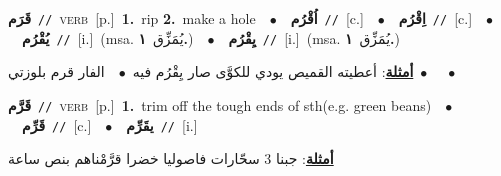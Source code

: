 \documentclass[10pt,a4paper,twoside]{article} %
\begin{document}
\begin{multicols}{2}
{\setlength\topsep{0pt}\textbf{\foreignlanguage{arabic}{قَرَم}}\ {\color{gray}\texttt{//}\color{black}}\ \textsc{verb}\ [p.]\ \textbf{1.}~rip  \textbf{2.}~make a hole\ \ $\bullet$\ \ \setlength\topsep{0pt}\textbf{\foreignlanguage{arabic}{اُقْرُم}}\ {\color{gray}\texttt{//}\color{black}}\ [c.]\ \ $\bullet$\ \ \setlength\topsep{0pt}\textbf{\foreignlanguage{arabic}{اِقْرُم}}\ {\color{gray}\texttt{//}\color{black}}\ [c.]\ \ $\bullet$\ \ \setlength\topsep{0pt}\textbf{\foreignlanguage{arabic}{يُقْرُم}}\ {\color{gray}\texttt{//}\color{black}}\ [i.]\ \color{gray}(msa. \foreignlanguage{arabic}{يُمَزِّق}~\foreignlanguage{arabic}{\textbf{١.}})\color{black}\ \ $\bullet$\ \ \setlength\topsep{0pt}\textbf{\foreignlanguage{arabic}{يِقْرُم}}\ {\color{gray}\texttt{//}\color{black}}\ [i.]\ \color{gray}(msa. \foreignlanguage{arabic}{يُمَزِّق}~\foreignlanguage{arabic}{\textbf{١.}})\color{black}\  \begin{flushright}\color{gray}\foreignlanguage{arabic}{\textbf{\underline{\foreignlanguage{arabic}{أمثلة}}}: أعطيته القميص يودي للكوَّى صار يِقْرُم فيه\ $\bullet$\ \  الفار قرم بلوزتي\ $\bullet$\ \  \ $\bullet$\ \  }\end{flushright}\color{black}} \vspace{2mm}

{\setlength\topsep{0pt}\textbf{\foreignlanguage{arabic}{قَرَّم}}\ {\color{gray}\texttt{//}\color{black}}\ \textsc{verb}\ [p.]\ \textbf{1.}~trim off the tough ends of sth(e.g. green beans)\ \ $\bullet$\ \ \setlength\topsep{0pt}\textbf{\foreignlanguage{arabic}{قَرِّم}}\ {\color{gray}\texttt{//}\color{black}}\ [c.]\ \ $\bullet$\ \ \setlength\topsep{0pt}\textbf{\foreignlanguage{arabic}{يقَرِّم}}\ {\color{gray}\texttt{//}\color{black}}\ [i.]\  \begin{flushright}\color{gray}\foreignlanguage{arabic}{\textbf{\underline{\foreignlanguage{arabic}{أمثلة}}}: جبنا 3 سحّارات فاصوليا خضرا قرَّمْناهم بنص ساعة}\end{flushright}\color{black}} \vspace{2mm}


\end{multicols}
\end{document}
